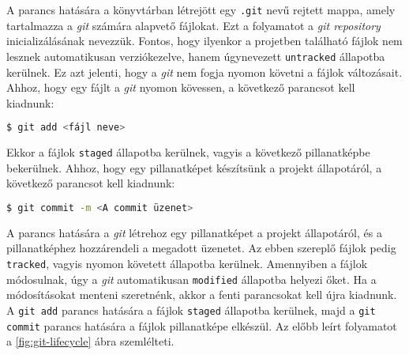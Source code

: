 A parancs hatására a könyvtárban létrejött egy \texttt{.git} nevű rejtett
mappa, amely tartalmazza a \textit{git} számára alapvető fájlokat.
Ezt a folyamatot a \textit{git repository} inicializálásának nevezzük.
Fontos, hogy ilyenkor a projetben található fájlok nem lesznek
automatikusan verziókezelve, hanem úgynevezett \texttt{untracked} állapotba
kerülnek. Ez azt jelenti, hogy a \textit{git} nem fogja nyomon követni a
fájlok változásait. Ahhoz, hogy egy fájlt a \textit{git} nyomon kövessen,
a következő parancsot kell kiadnunk:

\begin{lstlisting}[caption={Fájlok hozzáadása},language=sh]
  $ git add <fájl neve>
\end{lstlisting}

Ekkor a fájlok \texttt{staged} állapotba kerülnek, vagyis a következő
pillanatképbe bekerülnek. Ahhoz, hogy egy pillanatképet készítsünk a
projekt állapotáról, a következő parancsot kell kiadnunk:

\begin{lstlisting}[caption={Pillanatkép mentése},language=sh]
  $ git commit -m <A commit üzenet>
\end{lstlisting}

A parancs hatására a \textit{git} létrehoz egy pillanatképet a projekt
állapotáról, és a pillanatképhez hozzárendeli a megadott üzenetet. Az ebben
szereplő fájlok pedig \texttt{tracked}, vagyis nyomon követett állapotba
kerülnek. Amennyiben a fájlok módosulnak, úgy a \textit{git} automatikusan
\texttt{modified} állapotba helyezi őket. Ha a módosításokat menteni
szeretnénk, akkor a fenti parancsokat kell újra kiadnunk. A \texttt{git add}
parancs hatására a fájlok \texttt{staged} állapotba kerülnek, majd a
\texttt{git commit} parancs hatására a fájlok pillanatképe elkészül.
Az előbb leírt folyamatot a \ref{fig:git-lifecycle} ábra szemlélteti.

